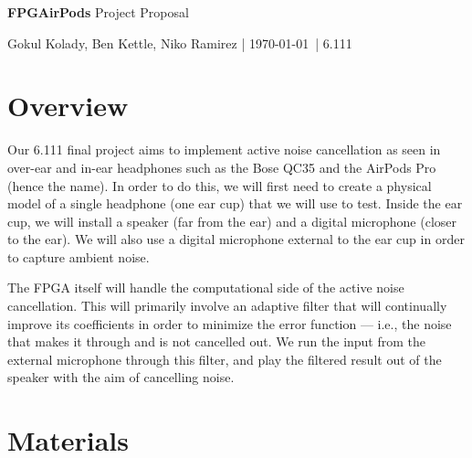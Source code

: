 \documentclass{fpgairpods}
\begin{document}
{\Huge \textbf{FPGAirPods} Project Proposal}

\vspace{2mm}
{Gokul Kolady, Ben Kettle, Niko Ramirez | \today \ | 6.111}
\vspace{5mm}


\begin{multicols}{2}
\section{Overview}
Our 6.111 final project aims to implement active noise cancellation as seen in over-ear and in-ear headphones such as the Bose QC35 and the AirPods Pro (hence the name). In order to do this, we will first need to create a physical model of a single headphone (one ear cup) that we will use to test. Inside the ear cup, we will install a speaker (far from the ear) and a digital microphone (closer to the ear). We will also use a digital microphone external to the ear cup in order to capture ambient noise.

The FPGA itself will handle the computational side of the active noise cancellation. This will primarily involve an adaptive filter that will continually improve its coefficients in order to minimize the error function --- i.e., the noise that makes it through and is not cancelled out. We run the input from the external microphone through this filter, and play the filtered result out of the speaker with the aim of cancelling noise.

\section{Materials}



\end{multicols}
\end{document}
